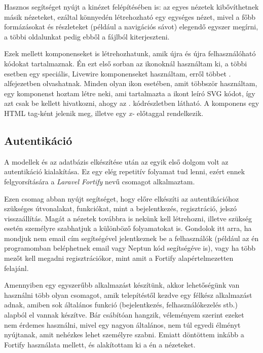 \documentclass[
]{thesis-ekf}
\theoremstyle{definition}
\theoremstyle{remark}
\begin{document}


Hasznos segítséget nyújt a kinézet felépítésében is: az egyes nézetek kibővíthetnek másik nézeteket, ezáltal könnyedén létrehozható egy egységes nézet, mivel a főbb formázásokat és részleteket (például a navigációs sávot) elegendő egyszer megírni, a többi oldalunkat pedig ebből a fájlból kiterjeszteni.

Ezek mellett komponenseket is létrehozhatunk, amik újra és újra felhasználóható kódokat tartalmaznak. Én ezt első sorban az ikonoknál használtam ki, a többi esetben egy speciális, Livewire komponenseket használtam, erről többet . alfejezetben olvashatnak. Minden olyan ikon esetében, amit többször használtam, egy komponenst hoztam létre neki, ami tartalmazta a ikont leíró SVG kódot, így azt csak be kellett hivatkozni, ahogy az . kódrészletben látható. A komponens egy HTML tag-ként jelenik meg, illetve egy \emph{x-} előtaggal rendelkezik.



\subsection{Autentikáció}
\label{fortifyAuth}

A modellek és az adatbázis elkészítése után az egyik első dolgom volt az autentikáció kialakítása. Ez egy elég repetitív folyamat tud lenni, ezért ennek felgyorsítására a \emph{Laravel Fortify}\cite{fortify} nevű csomagot alkalmaztam.

Ezen csomag abban nyújt segítséget, hogy előre elkészíti az autentikációhoz szükséges útvonalakat, funkciókat, mint a bejelentkezés, regisztráció, jelszó visszaállítás. Magát a nézetek továbbra is nekünk kell létrehozni, illetve szükség esetén személyre szabhatjuk a különböző folyamatokat is. Gondolok itt arra, ha mondjuk nem email cím segítségével jelentkeznek be a felhasználók (például az én programomban beléphetnek email vagy Neptun kód segítségéve is), vagy ha több mezőt kell megadni regisztrációkor, mint amit a Fortify alapértelmezetten felajánl.

Amennyiben egy egyszerűbb alkalmazást készítünk, akkor lehetőségünk van használni több olyan csomagot, amik telepítéstől kezdve egy félkész alkalmazást adnak, amiben sok általános funkció (bejelentkezés, felhasználókezelés stb.) alapból el vannak készítve. Bár csábítóan hangzik, véleményem szerint ezeket nem érdemes használni, mivel egy nagyon általános, nem túl egyedi élményt nyújtanak, amit nehézkes lehet személyre szabni. Emiatt döntöttem inkább a Fortify használata mellett, és alakítottam ki a én a nézeteket.
\end{document}
